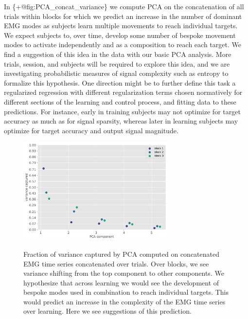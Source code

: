 In \{+@fig:PCA\_concat\_variance\} we compute PCA on the concatenation
of all trials within blocks for which we predict an increase in the
number of dominant EMG modes as subjects learn multiple movements to
reach individual targets. We expect subjects to, over time, develop some
number of bespoke movement modes to activate independently and as a
composition to reach each target. We find a suggestion of this idea in
the data with our basic PCA analysis. More trials, session, and subjects
will be required to explore this idea, and we are investigating
probabilistic measures of signal complexity such as entropy to formalize
this hypothesis. One direction might be to further define this task a
regularized regression with different regularization terms chosen
normatively for different sections of the learning and control process,
and fitting data to these predictions. For instance, early in training
subjects may not optimize for target accuracy as much as for signal
sparsity, whereas later in learning subjects may optimize for target
accuracy and output signal magnitude.

\begin{figure}
\label{fig:PCA_concat_variance}
\centering
\includegraphics[width=0.7\textwidth,height=\textheight]{images/data_analysis/center_hold/PCA_concat_variance.pdf}
\caption{Fraction of variance captured by PCA computed on concatenated
EMG time series concatenated over trials. Over blocks, we see variance
shifting from the top component to other components. We hypothesize that
across learning we would see the development of bespoke modes used in
combination to reach individual targets. This would predict an increase
in the complexity of the EMG time series over learning. Here we see
suggestions of this prediction.}\label{fig:PCA_concat_variance}
\end{figure}

